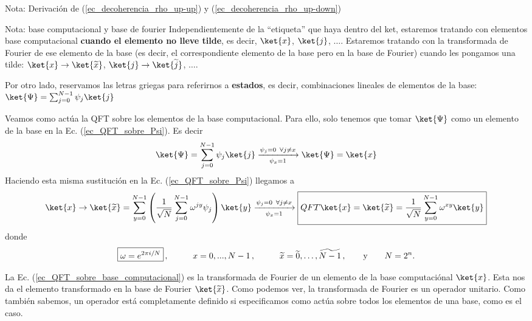 \documentclass[a4paper,11pt]{book} %
\numberwithin{equation}{chapter}
\def\lp{\left(}
\def\rp{\right)}
\begin{document}
\begin{mybox_blue}{Nota: Derivación de (\ref{ec_decoherencia_rho_up-up}) y  (\ref{ec_decoherencia_rho_up-down})}
	\begin{mybox_blue}{Nota: base computacional y base de fourier}
	Independientemente de la ``etiqueta'' que haya dentro del ket, estaremos tratando con elementos base computacional \textbf{cuando el elemento no lleve tilde}, 
	es decir, $\ket{x}$, $\ket{j}$, $\dots$. Estaremos tratando con la transformada de Fourier de ese elemento de la base (es decir, el correspondiente elemento de 
	la base pero en la base de Fourier) cuando les pongamos una tilde: $\ket{x} \to \ket{\widetilde{x}}$, $\ket{j} \to \ket{\widetilde{j}}$, $\dots$.
	
	Por otro lado, reservamos las letras griegas para referirnos a \textbf{estados}, es decir, combinaciones lineales de elementos de la base: $ \ket{\Psi} = \sum_{j=0}^{N-1} \psi_j \ket{j}$
	\end{mybox_blue} 

Veamos como actúa la QFT sobre los elementos de la base computacional. Para ello, solo tenemos que tomar $\ket{\Psi}$ como un elemento de la base en la Ec. (\ref{ec_QFT_sobre_Psi}). Es decir
	\begin{equation}
	\ket{\Psi} = \sum_{j=0}^{N-1} \psi_j \ket{j} \xrightarrow[\psi_x = 1]{\psi_j = 0 \,\,\, \forall  j \neq x} \ket{\Psi} = \ket{x}
	\end{equation}
	Haciendo esta misma sustitución en la Ec. (\ref{ec_QFT_sobre_Psi}) llegamos a
	\begin{equation} \label{ec_QFT_sobre_base_computacional}
	\ket{x} \to \ket{\widetilde{x}} = \sum_{y=0}^{N-1} \lp \frac{1}{\sqrt{N}} \sum_{j=0}^{N-1} \omega^{jy} \psi_j \rp \ket{y} 
	\xrightarrow[\psi_x = 1]{\psi_j = 0 \,\,\,  \forall j \neq x} 
	\boxed{QFT \ket{x} = \ket{\widetilde{x}} = \frac{1}{\sqrt{N}}  \sum_{y=0}^{N-1}  \omega^{xy}   \ket{y} }
	\end{equation}	
	donde 
	\begin{equation}
	\boxed{\omega  = e^{2\pi i  /N}} \, , \hspace{1cm}
	x   = 0,...,N-1 \, , \hspace{1cm}
	\widetilde{x}  = \widetilde{0}, \dots, \widetilde{N-1} \, ,\hspace{0.7cm}  \text{y} \hspace{0.7cm}
	N=2^n.
	\end{equation}		

La Ec. (\ref{ec_QFT_sobre_base_computacional}) es la transformada de Fourier de un elemento de la base computaciónal $\ket{x}$. Esta nos da el elemento transformado en la base de Fourier $\ket{\widetilde{x}}$. Como podemos ver, la transformada de Fourier es un operador unitario. Como también sabemos, un operador está completamente definido si especificamos como actúa sobre todos los elementos de una base, como es el caso.


\end{mybox_blue}
\end{document}
